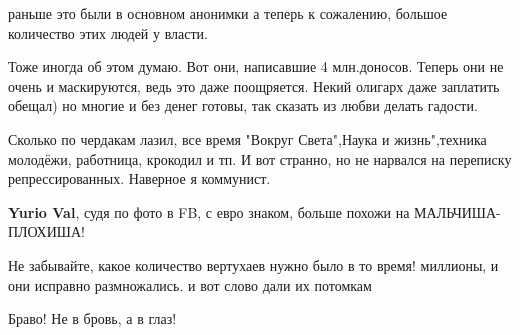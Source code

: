 \begin{itemize}
раньше это были в основном анонимки а теперь к сожалению, большое количество этих людей у власти.

 

Тоже иногда об этом думаю. Вот они, написавшие 4 млн.доносов. Теперь они не
очень и маскируются, ведь это даже поощряется. Некий олигарх даже заплатить
обещал) но многие и без денег готовы, так сказать из любви делать гадости.


 

Сколько по чердакам лазил, все время "Вокруг Света",Наука и жизнь",техника
молодёжи, работница, крокодил и тп. И вот странно, но не нарвался на переписку
репрессированных. Наверное я коммунист.

\begin{itemize}
 
\textbf{Yurio Val}, судя по фото в FB, с евро знаком, больше похожи на МАЛЬЧИША- ПЛОХИША!
\end{itemize}

 
Не забывайте, какое количество вертухаев нужно было в то время! миллионы, и они исправно размножались. и вот слово дали их потомкам

 
Браво! Не в бровь, а в глаз!


\end{itemize}
